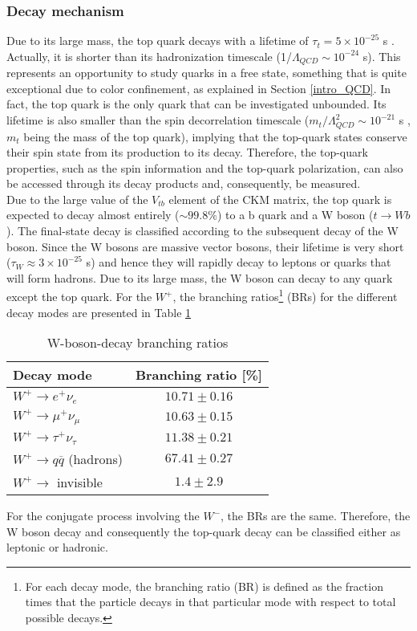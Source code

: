 \subsubsection{Decay mechanism}
\noindent Due to its large mass, the top quark decays with a lifetime of $\tau_t = 5\times 10^{-25}$ s \cite{Workman:2022ynf}. Actually, it is shorter than its hadronization timescale (1/$\Lambda_{QCD} \sim 10^{-24}$ s). This represents an opportunity to study quarks in a free state, something that is quite exceptional due to color confinement, as explained in Section \ref{intro_QCD}. In fact, the top quark is the only quark that can be investigated unbounded. Its lifetime is also smaller than the spin decorrelation timescale ($m_t/\Lambda^2_{QCD} \sim 10^{-21}$ s \cite{PhysRevD.81.074024}, $m_t$ being the mass of the top quark), implying that the top-quark states conserve their spin state from its production to its decay. Therefore, the top-quark properties, such as the spin information and the top-quark polarization, can also be accessed through its decay products and, consequently, be measured.\\
\indent Due to the large value of the $V_{tb}$ element of the CKM matrix, the top quark is expected to decay almost entirely ($\sim 99.8\% $) to a b quark and a W boson ($t \rightarrow Wb$). The final-state decay is classified according to the subsequent decay of the W boson. Since the W bosons are massive vector bosons, their lifetime is very short ($\tau_W \approx 3 \times 10^{-25}$ s) and hence they will rapidly decay to leptons or quarks that will form hadrons. Due to its large mass, the W boson can decay to any quark except the top quark. For the $W^+$, the branching ratios\footnote{For each decay mode, the branching ratio (BR) is defined as the fraction times that the particle decays in that particular mode with respect to total possible decays.} (BRs) for the different decay modes are presented in Table \ref{tab:W_decays}
\begin{table}[H]
\centering
\caption{W-boson-decay branching ratios \cite{Workman:2022ynf}}
\label{tab:W_decays}
\begin{tabular}{lc}
\hline
Decay mode                                & Branching ratio [\%] \\ \hline
$W^+ \rightarrow e^+\nu_e$                & $10.71 \pm 0.16$    \\
$W^+ \rightarrow \mu^+ \nu_\mu$           & $10.63 \pm 0.15$    \\
$W^+ \rightarrow \tau^+ \nu_\tau$         & $11.38 \pm 0.21$    \\
$W^+ \rightarrow q\overline{q}$ (hadrons) & $67.41 \pm 0.27$    \\
$W^+ \rightarrow $ invisible              & $1.4 \pm 2.9$      
\end{tabular}
\end{table}
For the conjugate process involving the $W^-$, the BRs are the same. Therefore, the W boson decay and consequently the top-quark decay can be classified either as leptonic or hadronic.
